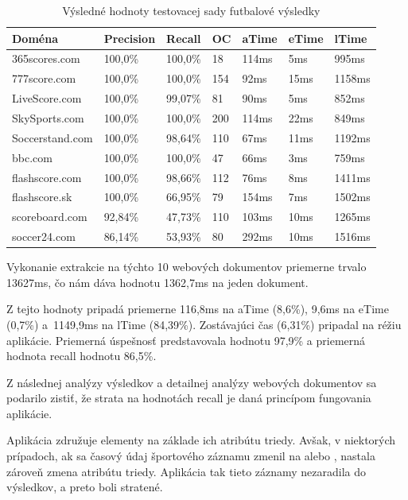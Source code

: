 \begin{table}[hbt]
\caption{Výsledné hodnoty testovacej sady futbalové výsledky}
\centering
\begin{tabular}{|l|l|l|l|l|l|l|}
\hline
\textbf{Doména}          & \textbf{Precision} & \textbf{Recall}  & \textbf{OC}  & \textbf{aTime} & \textbf{eTime} & \textbf{lTime}  \\ \hline
365scores.com   & 100,0\%   & 100,0\% & 18  & 114ms & 5ms   & 995ms  \\ \hline
777score.com    & 100,0\%   & 100,0\% & 154 & 92ms  & 15ms  & 1158ms \\ \hline
LiveScore.com   & 100,0\%   & 99,07\% & 81  & 90ms  & 5ms   & 852ms  \\ \hline
SkySports.com   & 100,0\%   & 100,0\% & 200 & 114ms & 22ms  & 849ms  \\ \hline
Soccerstand.com & 100,0\%   & 98,64\% & 110 & 67ms  & 11ms  & 1192ms \\ \hline
bbc.com         & 100,0\%   & 100,0\% & 47  & 66ms  & 3ms   & 759ms  \\ \hline
flashscore.com  & 100,0\%   & 98,66\% & 112 & 76ms  & 8ms   & 1411ms \\ \hline
flashscore.sk   & 100,0\%   & 66,95\% & 79  & 154ms & 7ms   & 1502ms \\ \hline
scoreboard.com  & 92,84\%   & 47,73\% & 110 & 103ms & 10ms  & 1265ms \\ \hline
soccer24.com    & 86,14\%   & 53,93\% & 80  & 292ms & 10ms  & 1516ms \\ \hline
\end{tabular}
\end{table}

Vykonanie extrakcie na týchto 10 webových dokumentov priemerne trvalo 13627ms, čo nám dáva hodnotu 1362,7ms na jeden dokument. 

Z tejto hodnoty pripadá priemerne 116,8ms na aTime (8,6\%), 9,6ms na eTime (0,7\%) a~1149,9ms na lTime (84,39\%). Zostávajúci čas (6,31\%) pripadal na réžiu aplikácie. Priemerná úspešnosť predstavovala hodnotu 97,9\% a priemerná hodnota recall hodnotu 86,5\%. 

\bigskip

Z následnej analýzy výsledkov a detailnej analýzy webových dokumentov sa podarilo zistiť, že strata na hodnotách recall je daná princípom fungovania aplikácie.

Aplikácia združuje elementy na základe ich atribútu triedy. Avšak, v niektorých prípadoch, ak sa časový údaj športového záznamu zmenil na  alebo ,  nastala zároveň zmena atribútu triedy. Aplikácia tak tieto záznamy nezaradila do výsledkov, a preto boli stratené.


